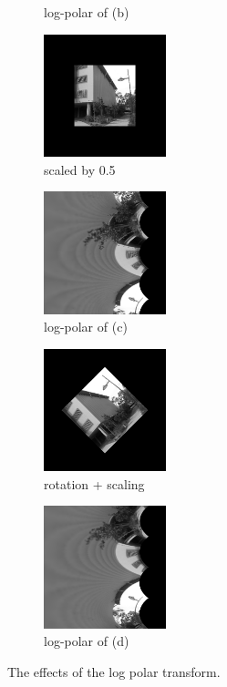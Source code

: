 \begin{figure}[t!]
\begin{subfigure}[b]{1.5in}
                \caption{log-polar of (b)}
                \label{fig:PCSecLPR}
        \end{subfigure}
         \begin{subfigure}[b]{1.5in}
                \includegraphics[width=1.4in]{images/pc/scaled}
                \caption{scaled by 0.5}
                \label{fig:PCSecOrig2}
        \end{subfigure}%
        \begin{subfigure}[b]{1.5in}
                \includegraphics[width=1.4in]{images/pc/logpolarScale}
                \caption{log-polar of (c)}
                \label{fig:PCSecLP}
        \end{subfigure}%
                \begin{subfigure}[b]{1.5in}
                \includegraphics[width=1.4in]{images/pc/rotationscale}
                \caption{rotation + scaling}
                \label{fig:PCSecRot}
        \end{subfigure}%
        \begin{subfigure}[b]{1.5in}
                \includegraphics[width=1.4in]{images/pc/logpolarRotationScale}
                \caption{log-polar of (d)}
                \label{fig:PCSecLPR}
        \end{subfigure}%
       \caption{The effects of the log polar transform.}\label{fig:PCSecB}
\end{figure}

